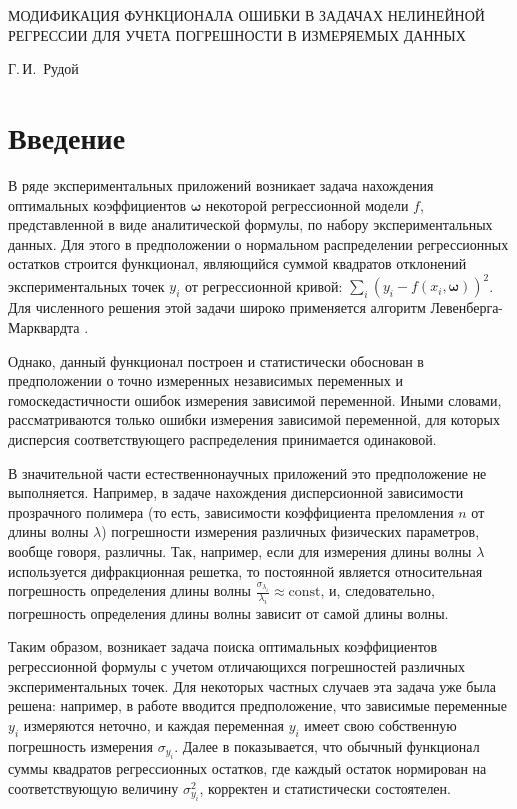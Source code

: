 \documentclass[11pt,a4paper]{article}
\begin{document}
\begin{center}
  МОДИФИКАЦИЯ ФУНКЦИОНАЛА ОШИБКИ В ЗАДАЧАХ НЕЛИНЕЙНОЙ РЕГРЕССИИ ДЛЯ УЧЕТА ПОГРЕШНОСТИ В ИЗМЕРЯЕМЫХ ДАННЫХ

  \bigskip
  Г.\,И.~Рудой
\end{center}

\section{Введение}

В ряде экспериментальных приложений возникает задача нахождения оптимальных
коэффициентов $\boldsymbol{\omega}$ некоторой регрессионной модели $f$, представленной в
виде аналитической формулы, по набору экспериментальных данных. Для этого
в предположении о нормальном распределении регрессионных остатков
строится функционал, являющийся суммой квадратов отклонений экспериментальных
точек $y_i$ от регрессионной кривой: $\sum_i (y_i - f(x_i, \boldsymbol{\omega}))^2$.
Для численного решения этой задачи широко применяется алгоритм Левенберга-Марквардта
\cite{Marquardt1963Algorithm}.

Однако, данный функционал построен и статистически обоснован в предположении
о точно измеренных независимых переменных и гомоскедастичности ошибок измерения
зависимой переменной. Иными словами, рассматриваются только ошибки измерения
зависимой переменной, для которых дисперсия соответствующего распределения
принимается одинаковой.

В значительной части естественнонаучных приложений это предположение не
выполняется. Например, в задаче нахождения дисперсионной зависимости прозрачного
полимера (то есть, зависимости коэффициента преломления $n$ от длины волны
$\lambda$) \cite{Rudoy15MonteCarlo} погрешности измерения
различных физических параметров, вообще говоря, различны. Так, например, если
для измерения длины волны $\lambda$ используется дифракционная решетка, то постоянной
является относительная погрешность определения длины волны
$\frac{\sigma_{\lambda_i}}{\lambda_i} \approx \text{const}$, и, следовательно,
погрешность определения длины волны зависит от самой длины волны.

Таким образом, возникает задача поиска оптимальных коэффициентов регрессионной
формулы с учетом отличающихся погрешностей различных экспериментальных точек.
Для некоторых частных случаев эта задача уже была решена: например, 
в работе \cite{...} вводится предположение, что зависимые переменные $y_i$ измеряются
неточно, и каждая переменная $y_i$ имеет свою собственную погрешность измерения
$\sigma_{y_i}$. Далее в \cite{...} показывается, что обычный функционал суммы квадратов
регрессионных остатков, где каждый остаток нормирован на соответствующую величину
$\sigma_{y_i}^2$, корректен и статистически состоятелен.
\end{document}
